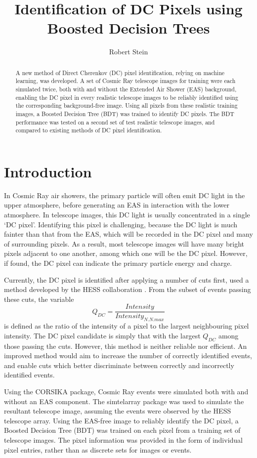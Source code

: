 \documentclass[]{article}
\title{Identification of DC Pixels using Boosted Decision Trees}
\author{Robert Stein}
\begin{document}
\maketitle

\begin{abstract}
A new method of Direct Cherenkov (DC) pixel identification, relying on machine learning, was developed. A set of Cosmic Ray telescope images for training were each simulated twice, both with and without the Extended Air Shower (EAS) background, enabling the DC pixel in every realistic telescope images to be reliably identified using the corresponding background-free image. Using all pixels from these realistic training images, a Boosted Decision Tree (BDT) was trained to identify DC pixels. The BDT performance was tested on a second set of test realistic telescope images, and compared to existing methods of DC pixel identification.  
\end{abstract}

\section{Introduction}
In Cosmic Ray air showers, the primary particle will often emit DC light in the upper atmosphere, before generating an EAS in interaction with the lower atmosphere. In telescope images, this DC light is usually concentrated in a single  \textquoteleft DC pixel'. Identifying this pixel is challenging, because the DC light is much fainter than that from the EAS, which will be recorded in the DC pixel and many of surrounding pixels. As a result, most telescope images will have many bright pixels adjacent to one another, among which one will be the DC pixel. However, if found, the DC pixel can indicate the primary particle energy and charge. 

Currently, the DC pixel is identified after applying a number of cuts first, used a method developed by the HESS collaboration \cite{hess07}. From the subset of events passing these cuts, the variable \[Q_{DC} = \frac{Intensity}{Intensity_{N.N.max}}\] is defined as the ratio of the intensity of a pixel to the largest neighbouring pixel intensity. The DC pixel candidate is simply that with the largest $Q_{DC}$ among those passing the cuts. However, this method is neither reliable nor efficient. An improved method would aim to increase the number of correctly identified events, and enable cuts which better discriminate between correctly and incorrectly identified events.

Using the CORSIKA package, Cosmic Ray events were simulated both with and without an EAS component. The sim\textunderscore telarray package was used to simulate the resultant telescope image, assuming the events were observed by the HESS telescope array. Using the EAS-free image to reliably identify the DC pixel, a Boosted Decision Tree (BDT) was trained on each pixel from a training set of telescope images. The pixel information was provided in the form of individual pixel entries, rather than as discrete sets for images or events.
\end{document}
